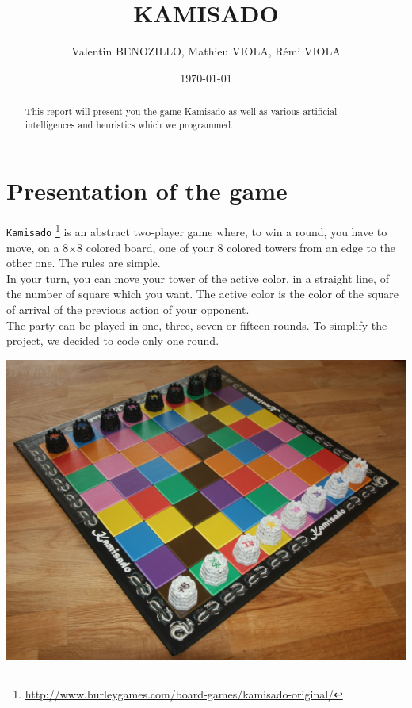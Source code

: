 \documentclass[a4paper, 11pt]{article}
\title{KAMISADO}
\author{Valentin BENOZILLO, Mathieu VIOLA, Rémi VIOLA}
\date{\today}
\begin{document}
\maketitle

\begin{abstract}
This report will present you the game Kamisado as well as various artificial intelligences and heuristics which we programmed.
\end{abstract}

\newpage

\tableofcontents

\newpage

\section{Presentation of the game}
\verb?Kamisado? \footnote{\url{http://www.burleygames.com/board-games/kamisado-original/}} is an abstract two-player game where, to win a round, you have to move, on a 8$\times$8 colored board, one of your 8 colored towers from an edge to the other one. The rules are simple.\\
In your turn, you can move your tower of the active color, in a straight line, of the number of square which you want. The active color is the color of the square of arrival of the previous action of your opponent.\\
The party can be played in one, three, seven or fifteen rounds. To simplify the project, we decided to code only one round.
\begin{center}
\includegraphics[scale = 0.09]{kamisado.jpeg}
\end{center}
\end{document}
